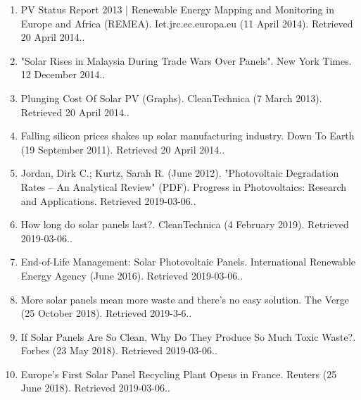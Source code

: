 \begin{enumerate}
[121]
^PV production grows despite a crisis-driven decline in investment. European Commission, Brussels, 30 September 2013.
\item PV Status Report 2013 | Renewable Energy Mapping and Monitoring in Europe and Africa (REMEA). Iet.jrc.ec.europa.eu (11 April 2014). Retrieved 20 April 2014..
\item "Solar Rises in Malaysia During Trade Wars Over Panels". New York Times. 12 December 2014..
\item Plunging Cost Of Solar PV (Graphs). CleanTechnica (7 March 2013). Retrieved 20 April 2014..
\item Falling silicon prices shakes up solar manufacturing industry. Down To Earth (19 September 2011). Retrieved 20 April 2014..
\item Jordan, Dirk C.; Kurtz, Sarah R. (June 2012). "Photovoltaic Degradation Rates – An Analytical Review" (PDF). Progress in Photovoltaics: Research and Applications. Retrieved 2019-03-06..
\item How long do solar panels last?. CleanTechnica (4 February 2019). Retrieved 2019-03-06..
\item End-of-Life Management: Solar Photovoltaic Panels. International Renewable Energy Agency (June 2016). Retrieved 2019-03-06..
\item More solar panels mean more waste and there’s no easy solution. The Verge (25 October 2018). Retrieved 2019-3-6..
\item If Solar Panels Are So Clean, Why Do They Produce So Much Toxic Waste?. Forbes (23 May 2018). Retrieved 2019-03-06..
\item Europe's First Solar Panel Recycling Plant Opens in France. Reuters (25 June 2018). Retrieved 2019-03-06..
\end{enumerate}
